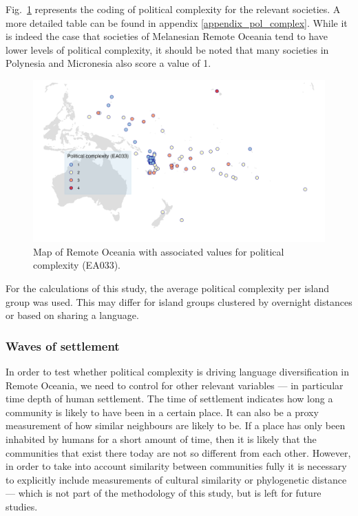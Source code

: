 \documentclass[a4paper,10pt]{article} %
\begin{document}
Fig.~\ref{pol_complex_map} represents the coding of political complexity for the relevant societies. A more detailed table can be found in appendix \ref{appendix_pol_complex}. While it is indeed the case that societies of Melanesian Remote Oceania tend to have lower levels of political complexity, it should be noted that many societies in Polynesia and Micronesia also score a value of 1.

\begin{figure}
\centering
\includegraphics[width=19cm]{map_pol_complex.png}
\caption[Map of Remote Oceania: Political complexity]{{Map of Remote Oceania with associated values for political complexity (EA033).}}
\label{pol_complex_map}
\end{figure}

For the calculations of this study, the average political complexity per island group was used. This may differ for island groups clustered by overnight distances or based on sharing a language.

\FloatBarrier
\subsubsection{Waves of settlement}
\label{appendix_def_dates}
In order to test whether political complexity is driving language diversification in Remote Oceania, we need to control for other relevant variables --- in particular time depth of human settlement. The time of settlement indicates how long a community is likely to have been in a certain place. It can also be a proxy measurement of how similar neighbours are likely to be. If a place has only been inhabited by humans for a short amount of time, then it is likely that the communities that exist there today are not so different from each other. However, in order to take into account similarity between communities fully it is necessary to explicitly include measurements of cultural similarity or phylogenetic distance --- which is not part of the methodology of this study, but is left for future studies.
\end{document}
